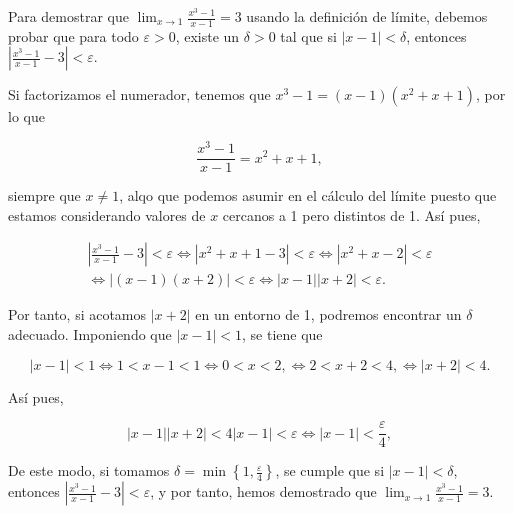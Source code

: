 \documentclass[
  spanish,
  a4paper,
]{scrreport}
\theoremstyle{definition}
\theoremstyle{remark}
\begin{document}
\begin{tcolorbox}[enhanced jigsaw, arc=.35mm, bottomrule=.15mm, bottomtitle=1mm, breakable, colback=white, colbacktitle=quarto-callout-tip-color!10!white, colframe=quarto-callout-tip-color-frame, coltitle=black, left=2mm, leftrule=.75mm, opacityback=0, opacitybacktitle=0.6, rightrule=.15mm, title=\textcolor{quarto-callout-tip-color}{\faLightbulb}\hspace{0.5em}{Solución}, titlerule=0mm, toprule=.15mm, toptitle=1mm]

Para demostrar que \(\lim_{x\to 1} \frac{x^3-1}{x-1} = 3\) usando la
definición de límite, debemos probar que para todo \(\varepsilon > 0\),
existe un \(\delta > 0\) tal que si \(|x - 1| < \delta\), entonces
\(\left|\frac{x^3-1}{x-1} - 3\right| < \varepsilon\).

Si factorizamos el numerador, tenemos que
\(x^3-1 = (x-1)(x^2 + x + 1)\), por lo que

\[
\frac{x^3-1}{x-1} = x^2 + x + 1,
\]

siempre que \(x \neq 1\), alqo que podemos asumir en el cálculo del
límite puesto que estamos considerando valores de \(x\) cercanos a 1
pero distintos de 1. Así pues,

\[
\begin{gathered}
\left|\frac{x^3-1}{x-1} - 3\right| < \varepsilon
\Leftrightarrow |x^2 + x + 1 - 3| < \varepsilon
\Leftrightarrow |x^2 + x - 2| < \varepsilon \\
\Leftrightarrow |(x-1)(x+2)| < \varepsilon
\Leftrightarrow |x-1||x+2| < \varepsilon.
\end{gathered}
\]

Por tanto, si acotamos \(|x+2|\) en un entorno de 1, podremos encontrar
un \(\delta\) adecuado. Imponiendo que \(|x-1| < 1\), se tiene que

\[
|x-1| < 1
\Leftrightarrow 1 < x-1 < 1 
\Leftrightarrow 0 < x < 2,
\Leftrightarrow 2 < x+2 < 4,
\Leftrightarrow |x+2| < 4.
\]

Así pues,

\[
|x-1||x+2| < 4|x-1| < \varepsilon 
\Leftrightarrow |x-1| < \frac{\varepsilon}{4},
\]

De este modo, si tomamos
\(\delta = \min\left\{1, \frac{\varepsilon}{4}\right\}\), se cumple que
si \(|x-1| < \delta\), entonces
\(\left|\frac{x^3-1}{x-1} - 3\right| < \varepsilon\), y por tanto, hemos
demostrado que \(\lim_{x\to 1} \frac{x^3-1}{x-1} = 3\).

\end{tcolorbox}
\end{document}
